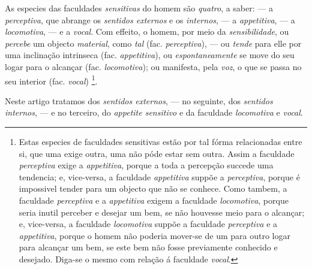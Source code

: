 
 
As especies das faculdades \emph{sensitivas} do homem são \emph{quatro}, a saber: --- a \emph{perceptiva}, que abrange os \emph{sentidos externos} e os \emph{internos}, --- a \emph{appetitiva}, --- a \emph{locomotiva}, --- e a \emph{vocal}. Com effeito, o homem, por meio da \emph{sensibilidade}, ou \emph{percebe} um objecto \emph{material}, como \emph{tal} (fac. \emph{perceptiva}), --- ou \emph{tende} para elle por uma inclinação intrinseca (fac. \emph{appetitiva}), ou \emph{espontaneamente} se move do seu logar para o alcançar (fac. \emph{locomotiva}); ou manifesta, pela \emph{voz}, o que se passa no seu interior (fac. \emph{vocal}) \footnote{Estas especies de faculdades sensitivas estão por tal fórma relacionadas entre si, que uma exige outra, uma não póde estar sem outra. Assim a faculdade \emph{perceptiva} exige a \emph{appetitiva}, porque a toda a percepção succede uma tendencia; e, vice-versa, a faculdade \emph{appetitiva} suppõe a \emph{perceptiva}, porque é impossivel tender para um objecto que não se conhece. Como tambem, a faculdade \emph{perceptiva} e a \emph{appetitiva} exigem a faculdade \emph{locomotiva}, porque seria inutil perceber e desejar um bem, se não houvesse meio para o alcançar; e, vice-versa, a faculdade \emph{locomotiva} suppõe a faculdade \emph{perceptiva} e a \emph{appetitiva}, porque o homem não poderia mover-se de um para outro logar para alcançar um bem, se este bem não fosse previamente conhecido e desejado. Diga-se o mesmo com relação á faculdade \emph{vocal}.}.

Neste artigo tratamos dos \emph{sentidos externos}, --- no seguinte, dos \emph{sentidos internos}, --- e no terceiro, do \emph{appetite sensitivo} e da faculdade \emph{locomotiva} e \emph{vocal}.


